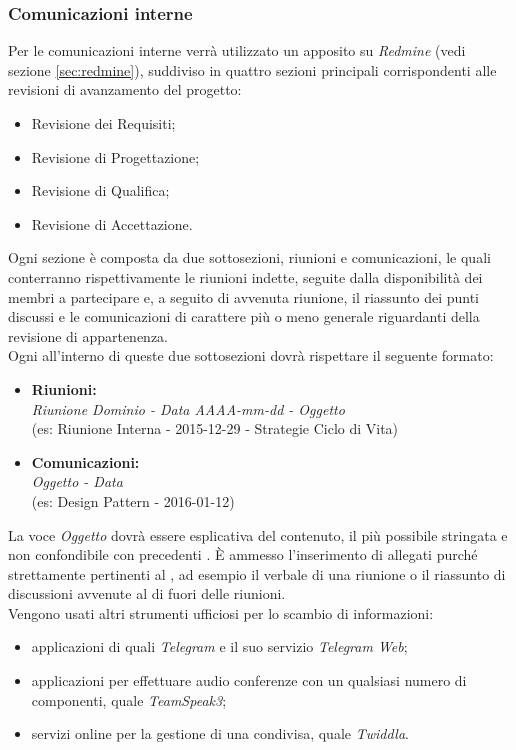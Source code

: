 \documentclass{scalatekids-article}
\begin{document}
\subsubsection{Comunicazioni interne}
\label{sec:ComunicazioniInterne}
Per le comunicazioni interne verrà utilizzato un  apposito su
\textit{Redmine} (vedi sezione \ref{sec:redmine}), suddiviso in quattro sezioni
principali corrispondenti alle revisioni di avanzamento del progetto:
\begin{itemize}
\item Revisione dei Requisiti;
\item Revisione di Progettazione;
\item Revisione di Qualifica;
\item Revisione di Accettazione.
\end{itemize}
Ogni sezione è composta da due sottosezioni, riunioni e comunicazioni, le quali
conterranno rispettivamente le riunioni indette, seguite dalla disponibilità dei
membri a partecipare e, a seguito di avvenuta riunione, il riassunto dei punti
discussi e le comunicazioni di carattere più o meno generale riguardanti
 della revisione di appartenenza.\\ Ogni  all'interno di
queste due sottosezioni dovrà rispettare il seguente formato:
\begin{itemize}
\item\textbf{Riunioni:}\\
  \textit{Riunione Dominio - Data AAAA-mm-dd - Oggetto}\\
  (es: Riunione Interna - 2015-12-29 - Strategie Ciclo di Vita)
\item\textbf{Comunicazioni:}\\
  \textit{Oggetto - Data}\\
  (es: Design Pattern - 2016-01-12)
\end{itemize}
La voce \textit{Oggetto} dovrà essere esplicativa del contenuto, il più
possibile stringata e non confondibile con precedenti . È ammesso
l'inserimento di allegati purché strettamente pertinenti al , ad
esempio il verbale di una riunione o il riassunto di discussioni avvenute al di
fuori delle riunioni.\\ Vengono usati altri strumenti ufficiosi per lo scambio
di informazioni:
\begin{itemize}
\item applicazioni di  quali \textit{Telegram} e il suo servizio \textit{Telegram Web};
\item applicazioni  per effettuare audio conferenze con un qualsiasi numero di componenti, quale \textit{TeamSpeak3};
\item servizi online per la gestione di una  condivisa, quale \textit{Twiddla}.
\end{itemize}
\end{document}
